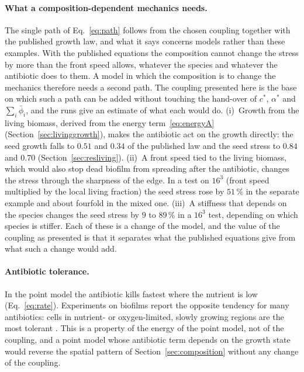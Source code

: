 \documentclass[11pt,a4paper]{article}
\newcommand{\lv}{\textstyle\sum_i\bar\phi_i}
\begin{document}
\paragraph{What a composition-dependent mechanics needs.} The single path of Eq.~\eqref{eq:path} follows from the chosen coupling together with the published growth law, and what it says concerns models rather than these examples. With the published equations the composition cannot change the stress by more than the front speed allows, whatever the species and whatever the antibiotic does to them. A model in which the composition is to change the mechanics therefore needs a second path. The coupling presented here is the base on which such a path can be added without touching the hand-over of $c^*$, $\alpha^*$ and $\lv$, and the runs give an estimate of what each would do. (i)~Growth from the living biomass, derived from the energy term~\eqref{eq:energyA} (Section~\ref{sec:livinggrowth}), makes the antibiotic act on the growth directly: the seed growth falls to $0.51$ and $0.34$ of the published law and the seed stress to $0.84$ and $0.70$ (Section~\ref{sec:resliving}). (ii)~A front speed tied to the living biomass, which would also stop dead biofilm from spreading after the antibiotic, changes the stress through the sharpness of the edge. In a test on $16^3$ (front speed multiplied by the local living fraction) the seed stress rose by $51\,\%$ in the separate example and about fourfold in the mixed one. (iii)~A stiffness that depends on the species changes the seed stress by $9$ to $89\,\%$ in a $16^3$ test, depending on which species is stiffer. Each of these is a change of the model, and the value of the coupling as presented is that it separates what the published equations give from what such a change would add.

\paragraph{Antibiotic tolerance.} In the point model the antibiotic kills fastest where the nutrient is low (Eq.~\eqref{eq:rate}). Experiments on biofilms report the opposite tendency for many antibiotics: cells in nutrient- or oxygen-limited, slowly growing regions are the most tolerant \citep{Walters2003Tolerance,StewartFranklin2008Heterogeneity}. This is a property of the energy of the point model, not of the coupling, and a point model whose antibiotic term depends on the growth state would reverse the spatial pattern of Section~\ref{sec:composition} without any change of the coupling.
\end{document}
